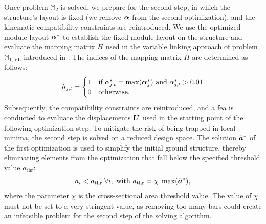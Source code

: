 Once problem $\mathbb{M}_2$ is solved, we prepare for the second step, in which the structure's layout is fixed (we remove $\bm{\alpha}$ from the second optimization), and the kinematic compatibility constraints are reintroduced. We use the optimized module layout $\bm{\alpha}^*$ to establish the fixed module layout on the structure and evaluate the mapping matrix $H$ used in the variable linking approach of problem $\mathbb{M}_{1,\text{VL}}$ introduced in . The indices of the mapping matrix $H$ are determined as follows:
\begin{equation}
    h_{j,t} =
    \begin{cases}
      1 & \text{if $\alpha^*_{j,t} = \max(\bm{\alpha}^*_{j})$ and $\alpha^*_{j,t}>0.01$} \\
      0 & \text{otherwise.} 
    \end{cases}
\end{equation}
Subsequently, the compatibility constraints are reintroduced, and a \gls{fea} is conducted to evaluate the displacements $\bm{U}$ used in the starting point of the following optimization step. To mitigate the risk of being trapped in local minima, the second step is solved on a reduced design space. The solution $\bm{\bar{a}}^*$ of the first optimization is used to simplify the initial ground structure, thereby eliminating elements from the optimization that fall below the specified threshold value $a_{\text{thr}}$:
\begin{equation}
    \bar{a}_i<a_{\text{thr}} \; \forall i, \text{ with }a_{\text{thr}} = \chi \; \max(\bar{\bm{a}}^*),
    \label{eq:06_thr}
\end{equation}
where the parameter $\chi$ is the cross-sectional area threshold value. The value of $\chi$ must not be set to a very stringent value, as removing too many bars could create an infeasible problem for the second step of the solving algorithm.

